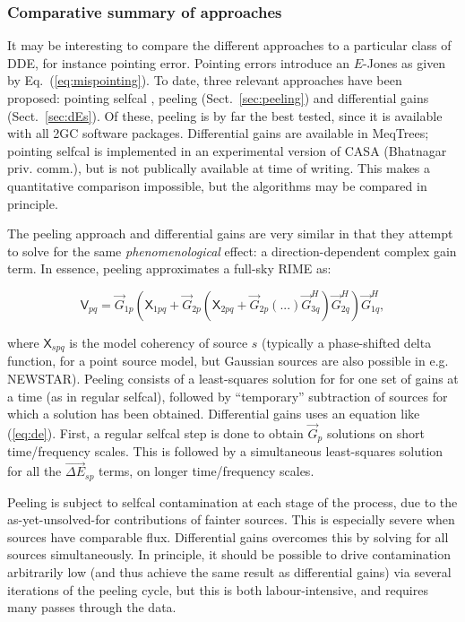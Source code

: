 \documentclass{aa}
\newcommand{\herm}{H}
\newcommand{\jones}[2]{\vec {#1}_{#2}}
\newcommand{\jonesT}[2]{\vec {#1}^{\herm}_{#2}}
\newcommand{\coh}[2]{\mathsf{{#1}}_{{#2}}}
\begin{document}
\subsubsection{Comparative summary of approaches}

It may be interesting to compare the different approaches to a particular class of DDE, for instance pointing error. Pointing errors introduce an $E$-Jones as given by Eq.~(\ref{eq:mispointing}). To date, three relevant approaches have been proposed: pointing selfcal \citep{SB:pointing}, peeling (Sect.~\ref{sec:peeling}) and differential gains (Sect.~\ref{sec:dEs}). Of these, peeling is by far the best tested, since it is available with all 2GC software packages. Differential gains are available in MeqTrees; pointing selfcal is implemented in an experimental version of CASA (Bhatnagar priv. comm.), but is not publically available at time of writing. This makes a quantitative comparison impossible, but the algorithms may be compared in principle.

The peeling approach and differential gains are very similar in that they attempt to solve for the same \emph{phenomenological} effect: a direction-dependent complex gain term. In essence, peeling approximates a full-sky RIME as:

\[
\coh{V}{pq} = \jones{G}{1p}(\coh{X}{1pq} + \jones{G}{2p}(\coh{X}{2pq} + \jones{G}{2p}(...)\jonesT{G}{3q})\jonesT{G}{2q})\jonesT{G}{1q},
\]

where $\coh{X}{spq}$ is the model coherency of source $s$ (typically a phase-shifted delta function, for a point source model, but Gaussian sources are also possible in e.g. NEWSTAR). Peeling consists of a least-squares solution for for one set of gains at a time (as in regular selfcal), followed by ``temporary'' subtraction of sources for which a solution has been obtained. Differential gains uses an equation like (\ref{eq:de}). First, a regular selfcal step is done to obtain $\jones{G}{p}$ solutions on short time/frequency scales. This is followed by a simultaneous least-squares solution for all the $\jones{\Delta E}{sp}$ terms, on longer time/frequency scales. 

Peeling is subject to selfcal contamination at each stage of the process, due to the as-yet-unsolved-for contributions of fainter sources. This is especially severe when sources have comparable flux. Differential gains overcomes this by solving for all sources simultaneously. In principle, it should be possible to drive contamination arbitrarily low (and thus achieve the same result as differential gains) via several iterations of the peeling cycle, but this is both labour-intensive, and requires many passes through the data.
\end{document}
